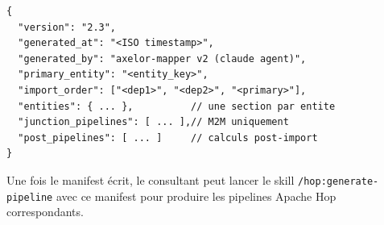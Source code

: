\begin{lstlisting}[language={}, basicstyle=\ttfamily\footnotesize, frame=single,
                   backgroundcolor=\color{gray!4}]
{
  "version": "2.3",
  "generated_at": "<ISO timestamp>",
  "generated_by": "axelor-mapper v2 (claude agent)",
  "primary_entity": "<entity_key>",
  "import_order": ["<dep1>", "<dep2>", "<primary>"],
  "entities": { ... },          // une section par entite
  "junction_pipelines": [ ... ],// M2M uniquement
  "post_pipelines": [ ... ]     // calculs post-import
}
\end{lstlisting}

\noindent Une fois le manifest écrit, le consultant peut lancer le skill
\texttt{/hop:generate-pipeline} avec ce manifest pour produire les pipelines
Apache Hop correspondants.

